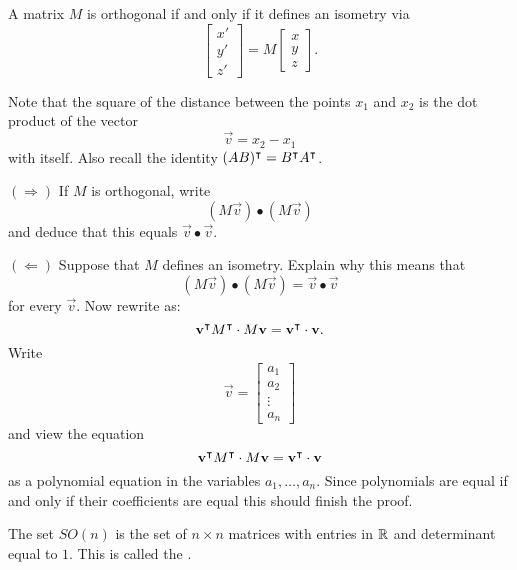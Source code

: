 \documentclass{ximera}
\begin{document}
\begin{lemma}
  A matrix $M$ is orthogonal if and only if it defines an isometry via
  \[
  \begin{bmatrix}
    x' \\ y' \\ z'
  \end{bmatrix}
  = M \begin{bmatrix} x \\ y \\ z\end{bmatrix}.
  \]
  \begin{sketch}
    Note that the square of the distance between the points $x_{1}$
    and $x_{2}$ is the dot product of the vector%
    \[
    \vec{v}=x_{2}-x_{1}%
    \]
    with itself.  Also recall the identity
    $(AB)^\intercal=B^\intercal A^\intercal$.
    
    $(\Rightarrow)$ If $M$ is orthogonal, write
    \[
    (M\vec{v}) \bullet (M\vec{v})
    \]
    and deduce that this equals ${\vec v}\bullet{\vec v}$.

    $(\Leftarrow)$ Suppose that $M$ defines an isometry. Explain why
    this means that
    \[
    ( M{\vec v}) \bullet ( M{\vec v})=
    {\vec v} \bullet {\vec v}
    \]
    for every ${\vec v}$.  Now rewrite as:
    \[
    \mathbf{v}^\intercal M^\intercal \cdot M\mathbf{v}=\mathbf{v}^\intercal
    \cdot{\mathbf v}.
    \]
    Write
    \[
    {\vec v} =
    \begin{bmatrix}
      a_1 \\ a_2 \\ \vdots \\ a_n
    \end{bmatrix}
    \]
     and view the equation 
    \[
    \mathbf{v}^\intercal M^\intercal \cdot M\mathbf{v}=\mathbf{v}^\intercal
    \cdot{\mathbf v}
    \]
    as a polynomial equation in the variables $a_1,\dots,a_n$. Since
    polynomials are equal if and only if their coefficients are equal
    this should finish the proof.
  \end{sketch}
\end{lemma}





\begin{definition}
  The set $SO(n)$ is the set of $n\times n$ matrices with entries in
  $\mathbb R$ and determinant equal to $1$. This is called the .
\end{definition}
\end{document}
